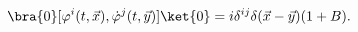 \begin{equation}
\bra{0}[\varphi^i(t,\vec{x}),\dot{\varphi}^j(t,\vec{y})]\ket{0}
=i\delta^{ij}\delta(\vec{x}-\vec{y})(1+B).\label{MODCCR}
\end{equation}

